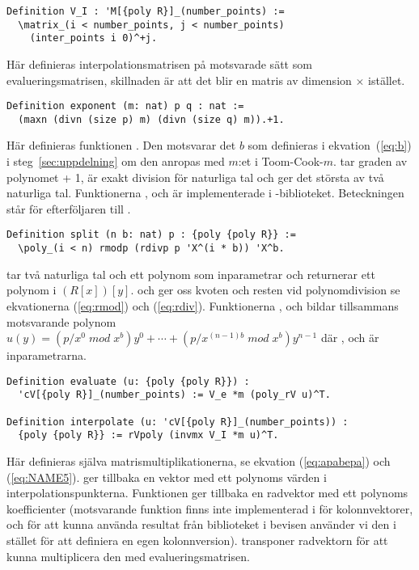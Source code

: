 \begin{lstlisting}
Definition V_I : 'M[{poly R}]_(number_points) :=
  \matrix_(i < number_points, j < number_points)
    (inter_points i 0)^+j.
\end{lstlisting}
Här definieras interpolationsmatrisen på motsvarade sätt som
evalueringsmatrisen, skillnaden är att det blir en matris av dimension
 $\times$  istället.

\begin{lstlisting}
Definition exponent (m: nat) p q : nat :=
  (maxn (divn (size p) m) (divn (size q) m)).+1.
\end{lstlisting}
Här definieras funktionen . Den motsvarar det $b$ som definieras i
ekvation~(\ref{eq:b}) i steg~\ref{sec:uppdelning} om den anropas med $m$:et i
Toom-Cook-$m$.  tar graden av polynomet  + 1,  är exakt
division för naturliga tal och  ger det största av två naturliga tal.
Funktionerna ,  och  är implementerade i
\ssr{}-biblioteket. Beteckningen  står för efterföljaren till .

\begin{lstlisting}
Definition split (n b: nat) p : {poly {poly R}} :=
  \poly_(i < n) rmodp (rdivp p 'X^(i * b)) 'X^b.
\end{lstlisting}
 tar två naturliga tal och ett polynom som inparametrar och returnerar
ett polynom i $(R[x])[y]$.  och  ger oss kvoten och resten
vid polynomdivision se ekvationerna (\ref{eq:rmod}) och (\ref{eq:rdiv}).
Funktionerna ,  och  bildar tillsammans
motsvarande polynom
$u(y)=(p/x^0\;mod\;x^b)y^0+\cdots+(p/x^{(n-1)b}\;mod\;x^b)y^{n-1}$ där ,
 och  är inparametrarna.

\begin{lstlisting}
Definition evaluate (u: {poly {poly R}}) :
  'cV[{poly R}]_(number_points) := V_e *m (poly_rV u)^T.

Definition interpolate (u: 'cV[{poly R}]_(number_points)) :
  {poly {poly R}} := rVpoly (invmx V_I *m u)^T.
\end{lstlisting}
Här definieras själva matrismultiplikationerna, se ekvation (\ref{eq:apabepa})
och (\ref{eq:NAME5}).  ger tillbaka en vektor med ett polynoms
värden i interpolationspunkterna. Funktionen  ger tillbaka en
radvektor med ett polynoms koefficienter (motsvarande funktion finns inte
implementerad i \ssr{} för kolonnvektorer, och för att kunna använda resultat
från biblioteket i bevisen använder vi den i stället för att definiera en egen
kolonnversion).  transponer radvektorn för att kunna multiplicera den med
evalueringsmatrisen.

